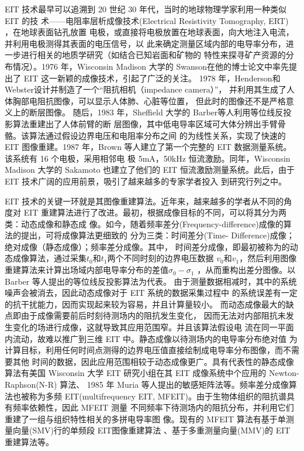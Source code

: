 
EIT 技术最早可以追溯到 20 世纪 30 年代，当时的地球物理学家利用一种类似 EIT 的技
术——电阻率层析成像技术(Electrical Resistivity Tomography, ERT) ，在地球表面钻孔放置
电极，或直接将电极放置在地球表面，向大地注入电流，并利用电极测得其表面的电压信号，以
此来确定测量区域内部的电导率分布，进一步进行相关的地质学研究（如结合已知岩面和矿物的
特性来探寻矿产资源的分布情况）\cite{1999Pottery}。1976 年，Wisconsin Madison 大学的
Swanson在他的博士论文中率先提出了 EIT 这一新颖的成像技术，引起了广泛的关注。
1978 年，Henderson和Webster设计并制造了一个“阻抗相机（impedance camera）”，
并利用其生成了人体胸部电阻抗图像，可以显示人体肺、心脏等位置，
但此时的图像还不是严格意义上的断层图像\cite{2007An}。
随后，1983 年，Sheffield 大学的 Barber等人利用等位线反投影算法重建出了人体前臂的断
层图像，其中低电导率区域可大体分辨出手臂骨骼。该算法通过假设边界电压和电阻率分布之间
的为线性关系，实现了快速的 EIT 图像重建。1987 年，Brown 等人建立了第一个完整的 EIT
数据测量系统\cite{1987Electrical}。该系统有 16 个电极，采用相邻电
极 5mA，50kHz 恒流激励。同年，Wisconsin Madison 大学的 Sakamoto 也建立了他们的 EIT
恒流激励测量系统。此后，由于 EIT 技术广阔的应用前景，吸引了越来越多的专家学者投入
到研究行列之中。

EIT 技术的关键一环就是其图像重建算法。近年来，越来越多的学者从不同的角度对 EIT
重建算法进行了改进。最初，根据成像目标的不同，可以将其分为两类：动态成像和静态成
像。如今，随着频率差分(Frequency-difference)成像的算法的提出，可将成像算法更细致的
分为三类：时间差分(Time- Difference)成像；绝对成像（静态成像）；频率差分成像。其中，
时间差分成像，即最初被称为的动态成像算法，通过采集$t_0$和$t_1$两个不同时刻的边界电压数据
$v_0$和$v_1$，然后利用图像重建算法来计算出场域内部电导率分布的差值$\sigma_0-\sigma_1$
，从而重构出差分图像。以 Barber 等人提出的等位线反投影算法为代表。
由于测量数据相减时，其中的系统噪声会被消去，因此动态成像对于 EIT 系统的数据采集过程中
的系统误差有一定的抗干扰能力，因而实现起来较为容易，并且计算量较小。
而动态成像最大的缺点即由于成像需要前后时刻待测场内的阻抗发生变化，
因而无法对内部阻抗未发生变化的场进行成像，这就导致其应用范围窄。并且该算法假设电
流在同一平面内流动，故难以推广到三维 EIT 中。静态成像以待测场内的电导率分布绝对值
为计算目标，利用任何时间点测得的边界电压值直接绘制成电导率分布图像，而不需要其他
时间的数据，因此应用范围相较于动态成像更广。具有代表性的静态成像算法有美国
Wisconsin 大学 EIT 研究小组在其 EIT 成像系统中个应用的 Newton-Raphson(N-R) 算法、
1985 年 Muria 等人提出的敏感矩阵法等。频率差分成像算法也被称为多频
EIT(multifrequency EIT, MFEIT)。由于生物体组织的阻抗谱具有频率依赖性，因此 MFEIT 测量
不同频率下待测场内的阻抗分布，并利用它们重建了一组与组织特性相关的多拼电导率图
像。现有的 MFEIT 算法有基于单测量向量(SMV)行的单频段 EIT图像重建算法\cite{AreconsAlg}
\cite{7932511}\cite{2018Image}、基于多重测量向量(MMV)的 EIT 重建算法\cite{9732193}等。

